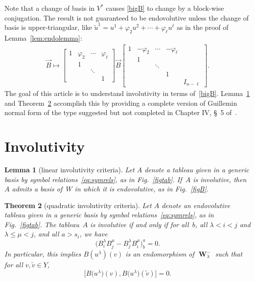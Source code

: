 \documentclass[11pt]{article}
\numberwithin{equation}{section}
\newtheorem{Theorem}{Theorem}[section]
\newtheorem{Lemma}[Theorem]{Lemma}
{\theoremstyle{definition}
\newtheorem{Definition}[Theorem]{Definition} }
\DeclareMathOperator{\Wu}{\mathbf{W}}
\begin{document}
Note that a change of basis in $V^*$ causes \eqref{bigB} to change by a block-wise
conjugation. The result is not guaranteed to be endovolutive unless the change of basis
is upper-triangular, like $\tilde{u}^1 = u^1 + \varphi_2 u^2 +  \cdots + \varphi_\ell u^\ell$ as in the proof of
Lemma~\ref{lem:endolemma}:
\begin{gather*}
\vec{B} \mapsto \begin{bmatrix}
1 & \varphi_2  & \cdots & \varphi_\ell \\
  & 1          &        &              \\
  &            & \ddots &              \\
  &            &        & 1
\end{bmatrix}
\vec{B}
\begin{bmatrix}
1 &-\varphi_2  & \cdots &-\varphi_\ell &     \\
  & 1          &        &              &  \\
  &            & \ddots &              &  \\
  &            &        & 1            &  \\
  &            &        &              &I_{n-\ell}
\end{bmatrix}.
\label{bigBtr}
\end{gather*}
The goal of this article is to understand involutivity in terms of~\eqref{bigB}.  Lemma~\ref{lem:invend} and Theorem~\ref{thm:gnf+}
accomplish this by providing a complete
version of Guillemin normal form of the type suggested but not completed in
Chapter IV, \S~5 of~\cite{BCGGG}.


\section{Involutivity}

\begin{Lemma}[linear involutivity criteria]\label{lem:invend}
Let $A$ denote a tableau given in a generic basis by
symbol relations~\eqref{eq:symrels}, as in Fig.~{\rm \ref{figtab}}.
If~$A$ is involutive, then~$A$ admits a basis of~$W$ in which it is
endovolutive, as in Fig.~{\rm \ref{figB}}.
\end{Lemma}

\begin{Theorem}[quadratic involutivity criteria]\label{thm:gnf+}
Let $A$ denote an endovolutive tableau given in a generic basis by
symbol relations~\eqref{eq:symrels}, as in Fig.~{\rm \ref{figtab}}.
The tableau~$A$ is involutive if and only if
for all~$b$, all $\lambda < i < j$ and $\lambda \leq \mu < j$, and all $a> s_i$, we have
\[\big(B^\lambda_iB^\mu_j - B^\lambda_jB^\mu_i\big)^a_b=0.\]
In particular, this implies $B(u^\lambda)(v)$ is an endomorphism of $\Wu^-_\lambda$ such
that
for all $v, \tilde{v} \in Y$,
\[
\big[B\big(u^\lambda\big)(v), B\big(u^\lambda\big)(\tilde{v})\big]=0.
\]
\end{Theorem}
\end{document}
